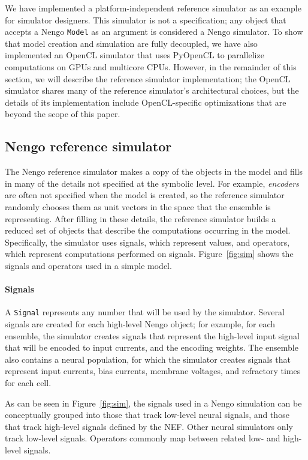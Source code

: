 \documentclass{frontiersSCNS}
\begin{document}
We have implemented a platform-independent
reference simulator as an example
for simulator designers.
This simulator is not a specification;
any object that accepts a Nengo \texttt{Model}
as an argument is considered a Nengo simulator.
To show that model creation and simulation
are fully decoupled,
we have also implemented
an OpenCL simulator
that uses PyOpenCL to parallelize
computations on GPUs and multicore CPUs.
However, in the remainder of this section,
we will describe
the reference simulator implementation;
the OpenCL simulator shares many
of the reference simulator's architectural choices,
but the details of its implementation
include OpenCL-specific optimizations
that are beyond the scope of this paper.

\subsection{Nengo reference simulator}

The Nengo reference simulator
makes a copy of the objects in the model
and fills in many of the details
not specified at the symbolic level.
For example, \textit{encoders}
are often not specified when the model is created,
so the reference simulator randomly chooses
them as unit vectors in the space that
the ensemble is representing.
After filling in these details,
the reference simulator
builds a reduced set of objects
that describe the computations
occurring in the model.
Specifically, the simulator
uses signals, which represent values,
and operators, which represent computations
performed on signals.
Figure~\ref{fig:sim} shows the signals
and operators used in a simple model.

\paragraph{Signals}

A \texttt{Signal} represents any number that
will be used by the simulator.
Several signals are created
for each high-level Nengo object;
for example, for each ensemble,
the simulator creates signals
that represent the high-level input
signal that will be encoded
to input currents,
and the encoding weights.
The ensemble also contains a neural population,
for which the simulator creates signals that represent
input currents, bias currents,
membrane voltages, and refractory times for each cell.

As can be seen in Figure~\ref{fig:sim},
the signals used in a Nengo simulation
can be conceptually grouped into
those that track low-level neural signals,
and those that track high-level signals
defined by the NEF.
Other neural simulators only track
low-level signals.
Operators commonly map
between related low- and high-level signals.
\end{document}
